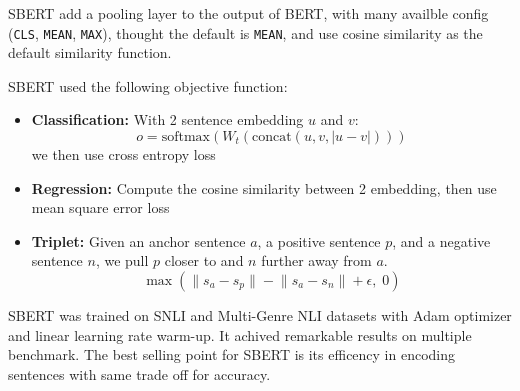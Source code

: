 SBERT add a pooling layer to the output of BERT, with many availble config (\texttt{CLS}, \texttt{MEAN}, \texttt{MAX}), thought the default is \texttt{MEAN}, and use cosine similarity as the default similarity function.

SBERT used the following objective function:

\begin{itemize}
    \item \textbf{Classification:} With 2 sentence embedding $u$ and $v$:
          \[
              o = \mathrm{softmax}\!\left(W_t(\text{concat}(u, v, |u - v|))\right)
          \]
          we then use cross entropy loss
    \item \textbf{Regression:} Compute the cosine similarity between 2 embedding, then use mean square error loss
    \item \textbf{Triplet:} Given an anchor
          sentence $a$, a positive sentence $p$, and a negative
          sentence $n$, we pull $p$ closer to and $n$ further away from $a$.
          \[
          \max\left(\lVert s_a - s_p \rVert - \lVert s_a - s_n \rVert + \epsilon,\; 0\right)
          \]

\end{itemize}


SBERT was trained on SNLI and  Multi-Genre NLI datasets with Adam optimizer and linear learning rate warm-up. It achived remarkable results on multiple benchmark. The best selling point for SBERT is its efficency in encoding sentences with same trade off for accuracy.

